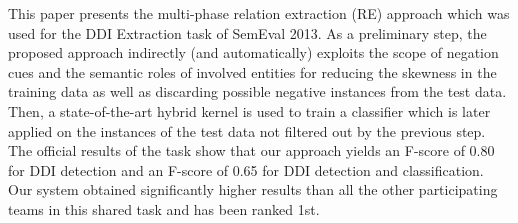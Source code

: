 This paper presents the multi-phase relation extraction (RE) approach which was used for the DDI Extraction task of SemEval 2013. As a preliminary step, the
 proposed approach indirectly (and automatically) exploits the scope of negation
 cues and the semantic roles of involved entities for reducing the skewness in
 the training data as well as discarding possible negative instances from the
 test data. Then, a state-of-the-art hybrid kernel is used to train a classifier
 which is later applied on the instances of the test data not filtered out by
 the previous step. The official results of the task show that our approach
 yields an F-score of 0.80 for DDI detection and an F-score of 0.65 for DDI
 detection and classification. Our system obtained significantly higher results
 than all the other participating teams in this shared task and has been ranked
 1st.

